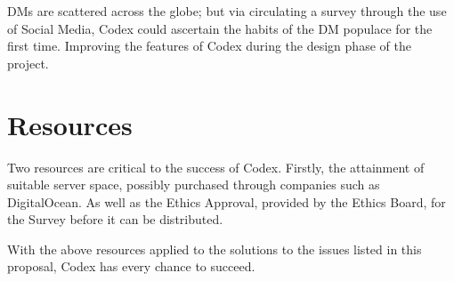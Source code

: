 \documentclass[proposal]{cmpreport}
\begin{document}
	DMs are scattered across the globe; but via circulating a survey through the use of Social Media, Codex could ascertain the habits of the DM populace for the first time. Improving the features of Codex during the design phase of the project.
	
	\section{Resources}
	Two resources are critical to the success of Codex. Firstly, the attainment of suitable server space, possibly purchased through companies such as DigitalOcean. As well as the Ethics Approval, provided by the Ethics Board, for the Survey before it can be distributed.
	
	With the above resources applied to the solutions to the issues listed in this proposal, Codex has every chance to succeed.
	
\end{document}
